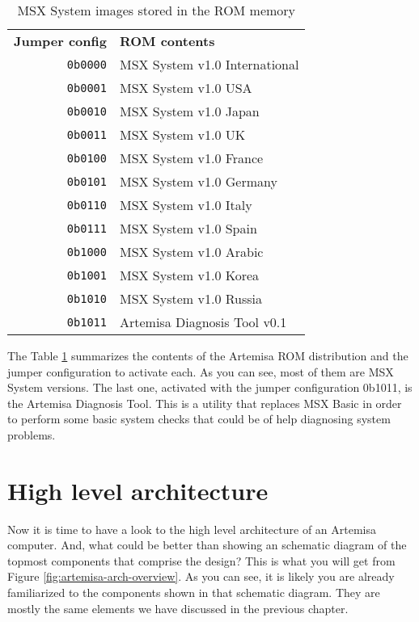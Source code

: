\begin{table}[h]
  \centering
  \begin{tabular}{r|l}
    {\bf Jumper config} & {\bf ROM contents}            \\
    {\tt 0b0000}        & MSX System v1.0 International \\
    {\tt 0b0001}        & MSX System v1.0 USA           \\
    {\tt 0b0010}        & MSX System v1.0 Japan         \\
    {\tt 0b0011}        & MSX System v1.0 UK            \\
    {\tt 0b0100}        & MSX System v1.0 France        \\
    {\tt 0b0101}        & MSX System v1.0 Germany       \\
    {\tt 0b0110}        & MSX System v1.0 Italy         \\
    {\tt 0b0111}        & MSX System v1.0 Spain         \\
    {\tt 0b1000}        & MSX System v1.0 Arabic        \\
    {\tt 0b1001}        & MSX System v1.0 Korea         \\
    {\tt 0b1010}        & MSX System v1.0 Russia        \\
    {\tt 0b1011}        & Artemisa Diagnosis Tool v0.1  \\
  \end{tabular}
  \caption{MSX System images stored in the ROM memory}
  \label{table:artemisa-rom-imgs}
\end{table}

The Table \ref{table:artemisa-rom-imgs} summarizes the contents of the Artemisa ROM distribution and the jumper configuration to activate each. As you can see, most of them are MSX System versions. The last one, activated with the jumper configuration 0b1011, is the Artemisa Diagnosis Tool. This is a utility that replaces MSX Basic in order to perform some basic system checks that could be of help diagnosing system problems.

\section{High level architecture}

Now it is time to have a look to the high level architecture of an Artemisa computer. And, what could be better than showing an schematic diagram of the topmost components that comprise the design? This is what you will get from Figure \ref{fig:artemisa-arch-overview}. As you can see, it is likely you are already familiarized to the components shown in that schematic diagram. They are mostly the same elements we have discussed in the previous chapter.

